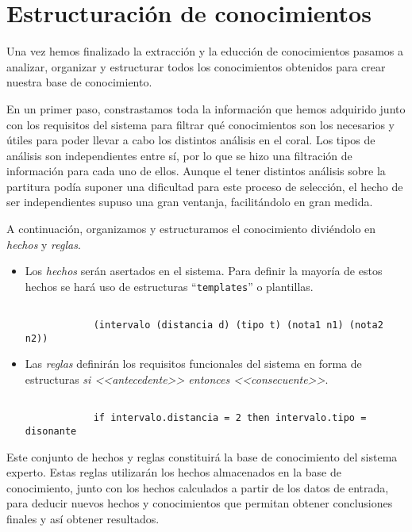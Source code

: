 \section{Estructuración de conocimientos} 

Una vez hemos finalizado la extracción y la educción de conocimientos pasamos a analizar, organizar y estructurar todos los conocimientos obtenidos para crear nuestra base de conocimiento.

En un primer paso, constrastamos toda la información que hemos adquirido junto con los requisitos del sistema para filtrar qué conocimientos son los necesarios y útiles para poder llevar a cabo los distintos análisis en el coral. Los tipos de análisis son independientes entre sí, por lo que se hizo una filtración de información para cada uno de ellos. Aunque el tener distintos análisis sobre la partitura podía suponer una dificultad para este proceso de selección, el hecho de ser independientes supuso una gran ventanja, facilitándolo en gran medida. 

A continuación, organizamos y estructuramos el conocimiento diviéndolo en \textit{hechos} y \textit{reglas}. 

\begin{itemize}

	\item Los \textit{hechos} serán asertados en el sistema. Para definir la mayoría de estos hechos se hará uso de estructuras ``\texttt{templates}'' o plantillas.

	\bigskip

		\begin{lstlisting}

			(intervalo (distancia d) (tipo t) (nota1 n1) (nota2 n2))

		\end{lstlisting}

	\bigskip

	\item Las \textit{reglas} definirán los requisitos funcionales del sistema en forma de estructuras \textit{si <<antecedente>> entonces <<consecuente>>}. 

	\bigskip

		\begin{lstlisting}

			if intervalo.distancia = 2 then intervalo.tipo = disonante

		\end{lstlisting}

	\bigskip

\end{itemize} 

Este conjunto de hechos y reglas constituirá la base de conocimiento del sistema experto. Estas reglas utilizarán los hechos almacenados en la base de conocimiento, junto con los hechos calculados a partir de los datos de entrada, para deducir nuevos hechos y conocimientos que permitan obtener conclusiones finales y así obtener resultados.